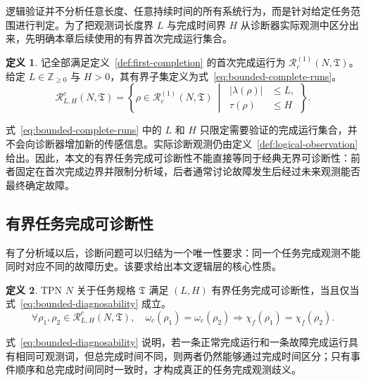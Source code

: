 \documentclass[master,fontset=ubuntu]{shnuthesis}
\theoremstyle{definition}
\newtheorem{thesisdefinition}{定义}
\begin{document}
逻辑验证并不分析任意长度、任意持续时间的所有系统行为，而是针对给定任务范围进行判定。为了把观测词长度界 \(L\) 与完成时间界 \(H\) 从诊断器实际观测中区分出来，先明确本章后续使用的有界首次完成运行集合。

\begin{thesisdefinition}
\label{def:bounded-complete-runs}
记全部满足定义~\ref{def:first-completion} 的首次完成运行为 \(\mathcal R_c^{(1)}(N,\mathfrak T)\)。给定 \(L\in\mathbb Z_{\geq0}\) 与 \(H>0\)，其有界子集定义为式~\eqref{eq:bounded-complete-runs}。
\begin{equation}
\mathcal R^c_{L,H}(N,\mathfrak T)
=
\left\{
\rho\in\mathcal R_c^{(1)}(N,\mathfrak T)
\ \middle|\
\begin{aligned}
|\lambda(\rho)|&\leq L,\\
\tau(\rho)&\leq H
\end{aligned}
\right\}.
\label{eq:bounded-complete-runs}
\end{equation}
\end{thesisdefinition}

式~\eqref{eq:bounded-complete-runs} 中的 \(L\) 和 \(H\) 只限定需要验证的完成运行集合，并不会向诊断器增加新的传感信息。实际诊断观测仍由定义~\ref{def:logical-observation} 给出。因此，本文的有界任务完成可诊断性不能直接等同于经典无界可诊断性：前者固定在首次完成边界并限制分析域，后者通常讨论故障发生后经过未来观测能否最终确定故障。

\subsection{有界任务完成可诊断性}

有了分析域以后，诊断问题可以归结为一个唯一性要求：同一个任务完成观测不能同时对应不同的故障历史。该要求给出本文逻辑层的核心性质。

\begin{thesisdefinition}
\label{def:bounded-task-diagnosability}
TPN \(N\) 关于任务规格 \(\mathfrak T\) 满足 \((L,H)\) 有界任务完成可诊断性，当且仅当式~\eqref{eq:bounded-diagnosability} 成立。
\begin{equation}
\forall \rho_1,\rho_2\in\mathcal R^c_{L,H}(N,\mathfrak T),\quad
\omega_c(\rho_1)
=
\omega_c(\rho_2)
\Longrightarrow
\chi_f(\rho_1)
=
\chi_f(\rho_2).
\label{eq:bounded-diagnosability}
\end{equation}
\end{thesisdefinition}

式~\eqref{eq:bounded-diagnosability} 说明，若一条正常完成运行和一条故障完成运行具有相同可观测词，但总完成时间不同，则两者仍然能够通过完成时间区分；只有事件顺序和总完成时间同时一致时，才构成真正的任务完成观测歧义。
\end{document}
